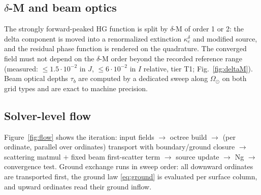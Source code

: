 \documentclass[11pt,a4paper]{article}
\newcommand{\ke}{\kappa_e}
\newcommand{\Om}{\Omega}
\begin{document}
\subsection{\texorpdfstring{$\delta$-M}{delta-M} and beam optics}

The strongly forward-peaked HG function is split by $\delta$-M of order
1 or 2: the delta component is moved into a renormalized extinction
$\ke^{\delta}$ and modified source, and the residual phase function is
rendered on the quadrature. The converged field must not depend on the
$\delta$-M order beyond the recorded reference range (measured: $\le1.5\cdot10^{-2}$
in $J$, $\le6\cdot10^{-2}$ in $I$ relative, tier T1;
Fig.~\ref{fig:deltaM}). Beam optical depths $\tau_b$ are computed by a
dedicated sweep along $\Om_\odot$ on both grid types and are exact to
machine precision.

\subsection{Solver-level flow}

Figure~\ref{fig:flow} shows the iteration: input fields $\to$ octree
build $\to$ (per ordinate, parallel over ordinates) transport with
boundary/ground closure $\to$ scattering matmul $+$ fixed beam
first-scatter term $\to$ source update $\to$ Ng $\to$ convergence test.
Ground exchange runs in sweep order: all downward ordinates are transported
first, the ground law \eqref{eq:ground} is evaluated per surface column,
and upward ordinates read their ground inflow.
\end{document}
